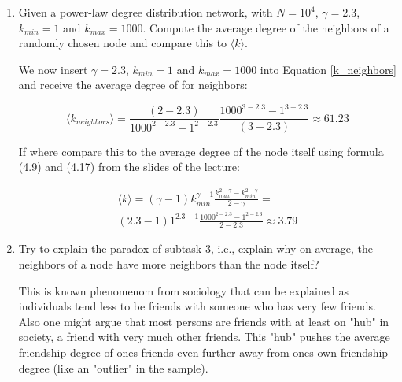 \begin{enumerate}
	\item Given a power-law degree distribution network, with $N = 10^4$, $\gamma = 2.3$, $k_{min} = 1$ and $k_{max} = 1000$. Compute the average degree of the neighbors of a randomly chosen node and compare this to $\langle k \rangle$.
	
	We now insert $\gamma = 2.3$, $k_{min} = 1$ and $k_{max} = 1000$ into Equation \ref{k_neighbors} and receive the average degree of for neighbors:
	
	\begin{equation}
		\langle k_{neighbors} \rangle = \frac{(2-2.3)}{1000^{2-2.3} - 1^{2-2.3}} \frac{1000^{3-2.3} - 1^{3-2.3}}{(3-2.3)} \approx 61.23
	\end{equation}

	If where compare this to the average degree of the node itself using formula (4.9) and (4.17) from the slides of the lecture:
	
	\begin{equation} \label{k_neighbors}
		\begin{split}
			\langle k \rangle = (\gamma-1) k_{min}^{\gamma-1} \frac{k_{max}^{2-\gamma} - k_{min}^{2-\gamma}}{2-\gamma} = \\
			(2.3-1) 1^{2.3-1} \frac{1000^{2-2.3} - 1^{2-2.3}}{2-2.3} \approx 3.79
		\end{split}
	\end{equation}
	
	\item Try to explain the paradox of subtask 3, i.e., explain why on average, the neighbors of a node have more neighbors than the node itself?
	
	This is known phenomenom from sociology that can be explained as individuals tend less to be friends with someone who has very few friends. Also one might argue that most persons are friends with at least on "hub" in society, a friend with very much other friends. This "hub" pushes the average friendship degree of ones friends even further away from ones own friendship degree (like an "outlier" in the sample). 
		
\end{enumerate}